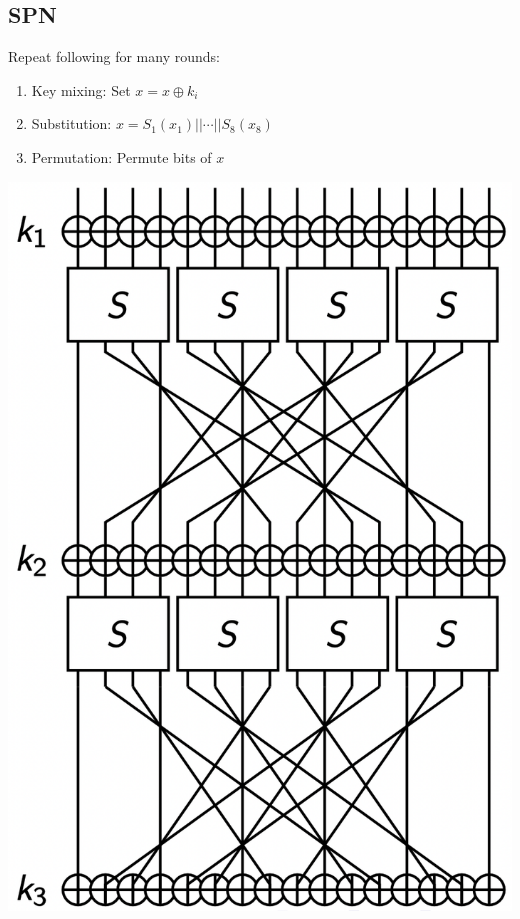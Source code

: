 \subsection*{SPN}
Repeat following for many rounds:
\begin{enumerate}
    \item Key mixing: Set $x=x\oplus k_i$
    \item Substitution: $x=S_1(x_1)||\cdots||S_8(x_8)$
    \item Permutation: Permute bits of $x$
\end{enumerate}
\includegraphics[width=\columnwidth]{SPN.png}

